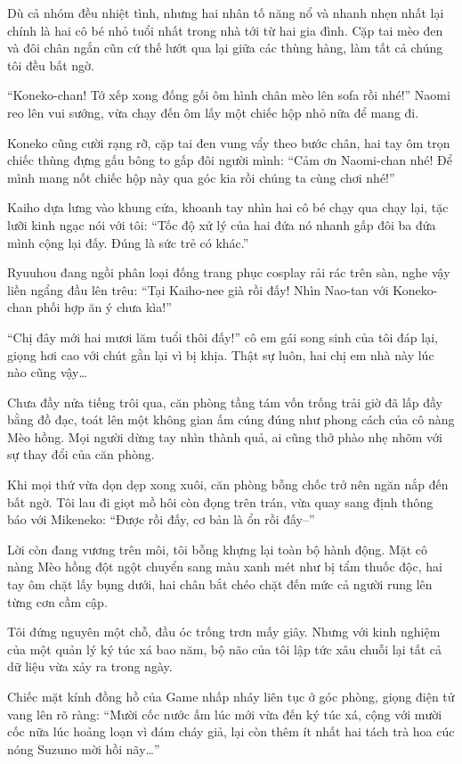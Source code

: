 ﻿\documentclass[../main.tex]{subfiles}
\begin{document}
Dù cả nhóm đều nhiệt tình, nhưng hai nhân tố năng nổ và nhanh nhẹn nhất lại chính là hai cô bé nhỏ tuổi nhất trong nhà tới từ hai gia đình. Cặp tai mèo đen và đôi chân ngắn cũn cứ thế lướt qua lại giữa các thùng hàng, làm tất cả chúng tôi đều bất ngờ.

``Koneko-chan! Tớ xếp xong đống gối ôm hình chân mèo lên sofa rồi nhé!'' Naomi reo lên vui sướng, vừa chạy đến ôm lấy một chiếc hộp nhỏ nữa để mang đi.

Koneko cũng cười rạng rỡ, cặp tai đen vung vẩy theo bước chân, hai tay ôm trọn chiếc thùng đựng gấu bông to gấp đôi người mình: ``Cảm ơn Naomi-chan nhé! Để mình mang nốt chiếc hộp này qua góc kia rồi chúng ta cùng chơi nhé!''

Kaiho dựa lưng vào khung cửa, khoanh tay nhìn hai cô bé chạy qua chạy lại, tặc lưỡi kinh ngạc nói với tôi: ``Tốc độ xử lý của hai đứa nó nhanh gấp đôi ba đứa mình cộng lại đấy. Đúng là sức trẻ có khác.''

Ryuuhou đang ngồi phân loại đống trang phục cosplay rải rác trên sàn, nghe vậy liền ngẩng đầu lên trêu: ``Tại Kaiho-nee già rồi đấy! Nhìn Nao-tan với Koneko-chan phối hợp ăn ý chưa kìa!''

``Chị đây mới hai mươi lăm tuổi thôi đấy!'' cô em gái song sinh của tôi đáp lại, giọng hơi cao với chút gằn lại vì bị khịa. Thật sự luôn, hai chị em nhà này lúc nào cũng vậy\dots

Chưa đầy nửa tiếng trôi qua, căn phòng tầng tám vốn trống trải giờ đã lấp đầy bằng đồ đạc, toát lên một không gian ấm cúng đúng như phong cách của cô nàng Mèo hồng. Mọi người dừng tay nhìn thành quả, ai cũng thở phào nhẹ nhõm với sự thay đổi của căn phòng.

Khi mọi thứ vừa dọn dẹp xong xuôi, căn phòng bỗng chốc trở nên ngăn nắp đến bất ngờ. Tôi lau đi giọt mồ hôi còn đọng trên trán, vừa quay sang định thông báo với Mikeneko: ``Được rồi đấy, cơ bản là ổn rồi đấy--''

Lời còn đang vương trên môi, tôi bỗng khựng lại toàn bộ hành động. Mặt cô nàng Mèo hồng đột ngột chuyển sang màu xanh mét như bị tẩm thuốc độc, hai tay ôm chặt lấy bụng dưới, hai chân bắt chéo chặt đến mức cả người rung lên từng cơn cầm cập.

Tôi đứng nguyên một chỗ, đầu óc trống trơn mấy giây. Nhưng với kinh nghiệm của một quản lý ký túc xá bao năm, bộ não của tôi lập tức xâu chuỗi lại tất cả dữ liệu vừa xảy ra trong ngày.

Chiếc mặt kính đồng hồ của Game nhấp nháy liên tục ở góc phòng, giọng điện tử vang lên rõ ràng: ``Mười cốc nước ấm lúc mới vừa đến ký túc xá, cộng với mười cốc nữa lúc hoảng loạn vì đám cháy giả, lại còn thêm ít nhất hai tách trà hoa cúc nóng Suzuno mời hồi nãy\dots''
\end{document}
